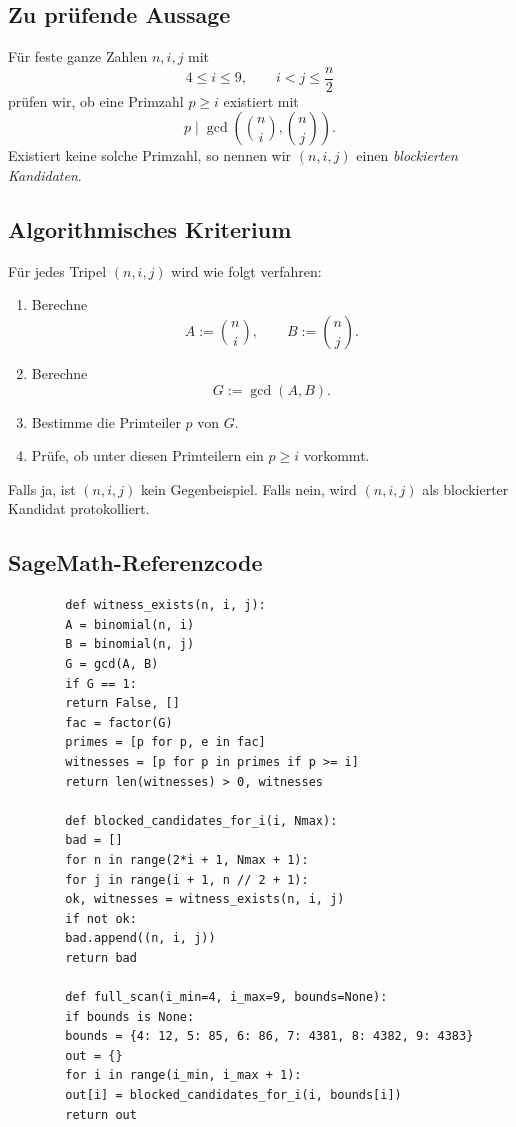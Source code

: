 \documentclass[12pt,a4paper]{article}
\theoremstyle{plain}
\theoremstyle{definition}
\theoremstyle{remark}
\begin{document}
	\subsection{Zu prüfende Aussage}
	
	Für feste ganze Zahlen \(n,i,j\) mit
	\[
	4\le i\le 9,\qquad i<j\le \frac n2
	\]
	prüfen wir, ob eine Primzahl \(p\ge i\) existiert mit
	\[
	p\mid \gcd\!\left(\binom ni,\binom nj\right).
	\]
	Existiert keine solche Primzahl, so nennen wir \((n,i,j)\) einen \emph{blockierten Kandidaten}.
	
	\subsection{Algorithmisches Kriterium}
	
	Für jedes Tripel \((n,i,j)\) wird wie folgt verfahren:
	
	\begin{enumerate}[label=\arabic*)]
		\item Berechne
		\[
		A:=\binom ni,\qquad B:=\binom nj.
		\]
		\item Berechne
		\[
		G:=\gcd(A,B).
		\]
		\item Bestimme die Primteiler \(p\) von \(G\).
		\item Prüfe, ob unter diesen Primteilern ein \(p\ge i\) vorkommt.
	\end{enumerate}
	
	Falls ja, ist \((n,i,j)\) kein Gegenbeispiel. Falls nein, wird \((n,i,j)\) als blockierter Kandidat protokolliert.
	
	\subsection{SageMath-Referenzcode}
	
	\begin{verbatim}
		def witness_exists(n, i, j):
		A = binomial(n, i)
		B = binomial(n, j)
		G = gcd(A, B)
		if G == 1:
		return False, []
		fac = factor(G)
		primes = [p for p, e in fac]
		witnesses = [p for p in primes if p >= i]
		return len(witnesses) > 0, witnesses
		
		def blocked_candidates_for_i(i, Nmax):
		bad = []
		for n in range(2*i + 1, Nmax + 1):
		for j in range(i + 1, n // 2 + 1):
		ok, witnesses = witness_exists(n, i, j)
		if not ok:
		bad.append((n, i, j))
		return bad
		
		def full_scan(i_min=4, i_max=9, bounds=None):
		if bounds is None:
		bounds = {4: 12, 5: 85, 6: 86, 7: 4381, 8: 4382, 9: 4383}
		out = {}
		for i in range(i_min, i_max + 1):
		out[i] = blocked_candidates_for_i(i, bounds[i])
		return out
	\end{verbatim}
	
\end{document}
